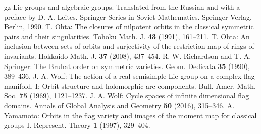 \documentclass{amsart}
\theoremstyle{definition}
\begin{document}
\begin{thebibliography}{gz}
Lie groups and algebraic groups. 
Translated from the Russian and with a preface by D. A. Leites. Springer Series in Soviet Mathematics. Springer-Verlag, Berlin, 1990.
 T. Ohta: The closures of nilpotent orbits in the classical symmetric pairs and their singularities. Tohoku Math. J. \textbf{43} (1991), 161--211.
 T. Ohta: An inclusion between sets of orbits and surjectivity of the restriction map of rings of invariants.
Hokkaido Math. J. \textbf{37} (2008), 437--454. 
 R. W. Richardson and T. A. Springer:
The Bruhat order on symmetric varieties. Geom. Dedicata \textbf{35} (1990), 389--436.
 J. A. Wolf: The action of a real semisimple Lie group on a complex flag manifold. I: Orbit structure and holomorphic arc components.  Bull. Amer. Math. Soc. \textbf{75} (1969), 1121--1237.
 J. A. Wolf: Cycle spaces of infinite dimensional flag domains. Annals of Global Analysis and Geometry \textbf{50} (2016), 315--346.
 A. Yamamoto:
Orbits in the flag variety and images of the moment map for classical groups I.
Represent. Theory \textbf{1} (1997), 329--404.
\end{thebibliography}
\end{document}
